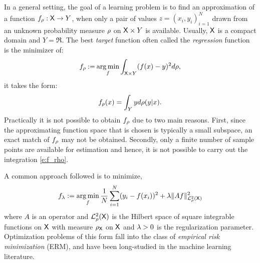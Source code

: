In a general setting, the goal of a learning problem is to find an approximation of a function $f_\rho : {\sf X} \to Y$, when only a pair of values $z = (x_i, y_i)_{i=1}^N$ drawn from an unknown probability measure $\rho$ on ${\sf X} \times Y$ is available. Usually, ${\sf X}$ is a compact domain and $Y = \Re$. The best \textit{target} function often called the \textit{regression} function is the minimizer of:
\begin{equation}
f_\rho \mathbin{:=} \mathop{\rm arg{\,}min}_f \int_{{\sf X} \times Y} (f(x) - y) ^2 d\rho,
\end{equation}
it takes the form:
\begin{equation}
f_\pr(x) = \int_Y y d\pr(y|x).
\label{e:f_rho}
\end{equation}
Practically it is not possible to obtain $f_\rho$ due to two main reasons. First, since the approximating function space that is chosen is typically a small subspace, an exact match of $f_\rho$ may not be obtained. Secondly, only a finite number of sample points are available for estimation and hence, it is not possible to carry out the integration \eqref{e:f_rho}.

A common approach followed is to minimize,
\begin{equation}
f_\reg := \argmin_f \frac{1}{N}\sum_{i=1}^N (y_i - f(x_i))^2 + \reg \|A f \|^2_{\mathcal{L}_{\pr}^2(\state)}
\label{e:erm1}
\end{equation}
where $A$ is an operator and $\mathcal{L}^2_{\rho}({\sf X})$ is the Hilbert space of square integrable functions on ${\sf X}$ with measure $\rho_{\sf X}$ on ${\sf X}$ and $\lambda>0$ is the regularization parameter. Optimization problems of this form fall into the class of \textit{empirical risk minimization} (ERM), and have been long-studied in the machine learning literature.   

